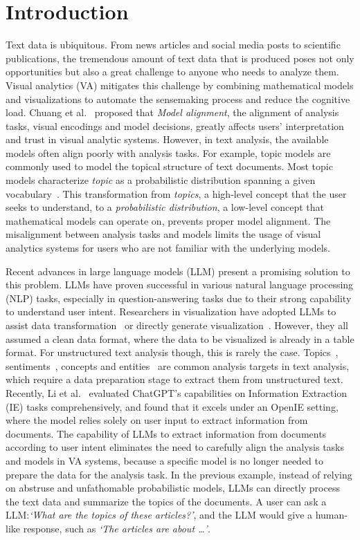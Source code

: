 \section{Introduction}
Text data is ubiquitous.
From news articles and social media posts to scientific publications, the tremendous amount of text data that is produced poses not only opportunities but also a great challenge to anyone who needs to analyze them.
Visual analytics (VA) mitigates this challenge by combining mathematical models and visualizations to automate the sensemaking process and reduce the cognitive load.
Chuang et al.~\cite{chuang2012interpretation} proposed that \textit{Model alignment}, the alignment of analysis tasks, visual encodings and model decisions,
greatly affects users' interpretation and trust in visual analytic systems.
However, in text analysis, the available models often align poorly with analysis tasks.
For example, topic models are commonly used to model the topical structure of text documents.
Most topic models characterize \textit{topic} as a probabilistic distribution spanning a given vocabulary~\cite{vayansky2020review}.
This transformation from \textit{topics}, a high-level concept that the user seeks to understand, to a \textit{probabilistic distribution}, a low-level concept that mathematical models can operate on, prevents proper model alignment.
The misalignment between analysis tasks and models limits the usage of visual analytics systems for users who are not familiar with the underlying models.

Recent advances in large language models (LLM) present a promising solution to this problem.
LLMs have proven successful in various natural language processing (NLP) tasks, especially in question-answering tasks due to their strong capability to understand user intent.
Researchers in visualization have adopted LLMs to assist data transformation~\cite{wang2023dataformulator} or directly generate visualization~\cite{maddigan2023chat2vis}.
However, they all assumed a clean data format, where the data to be visualized is already in a table format. 
For unstructured text analysis though, this is rarely the case.
Topics~\cite{atzberger2023evaluatetopicmodel}, sentiments~\cite{beasley2021through}, concepts and entities~\cite{park2018conceptvector,cao2010facetatlas} are common analysis targets in text analysis, which require a data preparation stage to extract them from unstructured text.
Recently, Li et al.~\cite{li2023evaluateChatgpt} evaluated ChatGPT's capabilities on Information Extraction (IE) tasks comprehensively, and found that it excels under an OpenIE setting, where the model relies solely on user input to extract information from documents.
The capability of LLMs to extract information from documents according to user intent eliminates the need to carefully align the analysis tasks and models in VA systems,
because a specific model is no longer needed to prepare the data for the analysis task.
In the previous example, instead of relying on abstruse and unfathomable probabilistic models, LLMs can directly process the text data and summarize the topics of the documents.
A user can ask a LLM:\@ \textit{`What are the topics of these articles?'}, and the LLM would give a human-like response, such as \textit{`The articles are about \ldots'}.

